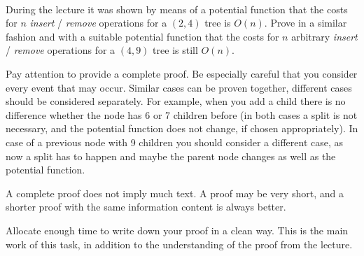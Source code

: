  \\
During the lecture it was shown by means of a potential function that the costs 
for $n$ \emph{insert} /
\emph{remove} operations for a $(2,4)$ tree is $O(n)$.
Prove in a similar fashion and with a suitable potential function that the 
costs for $n$ arbitrary \emph{insert} /
\emph{remove} operations for a $(4,9)$ tree is still $O(n)$.


Pay attention to provide a complete proof. Be especially careful that you 
consider every event that may occur. Similar cases can be proven together, 
different cases should be considered separately.
For example, when you add a child there is no difference whether the
node has 6 or 7 children before (in both cases a split is not necessary, and 
the potential function does not change, if chosen appropriately). In case of a 
previous node with 9 children you should consider a different case, as now a 
split has to happen and maybe the parent node changes as well as the potential 
function.

A complete proof does not imply much text. A proof may be very short, and a 
shorter proof with the same information content is always better.

Allocate enough time to write down your proof in a clean way. This is the main 
work of this task, in addition to the understanding of the proof from the 
lecture.